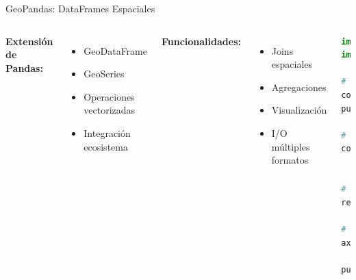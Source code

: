 \documentclass[10pt,aspectratio=169]{beamer}
\begin{document}
\begin{frame}[fragile]{GeoPandas: DataFrames Espaciales}
    \begin{columns}[T]
        \footnotesize
        \textbf{Extensión de Pandas:}
        \begin{itemize}
            \item GeoDataFrame
            \item GeoSeries
            \item Operaciones vectorizadas
            \item Integración ecosistema
        \end{itemize}
        
        \textbf{Funcionalidades:}
        \begin{itemize}
            \item Joins espaciales
            \item Agregaciones
            \item Visualización
            \item I/O múltiples formatos
        \end{itemize}
        
        \begin{lstlisting}[language=Python]
import geopandas as gpd
import matplotlib.pyplot as plt

# Cargar datos
comunas = gpd.read_file('comunas.shp')
puntos = gpd.read_file('colegios.geojson')

# Join espacial
colegios = gpd.sjoin(puntos, comunas, 
                     predicate='within')

# Agregacion
resumen = colegios.groupby('COMUNA').size()

# Visualizacion
ax = comunas.plot(column='POBLACION',
                  legend=True)
puntos.plot(ax=ax, color='red', markersize=2)
        \end{lstlisting}
    \end{columns}
\end{frame}
\end{document}
